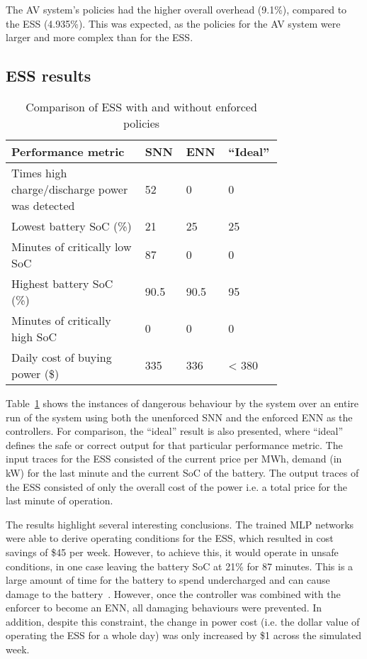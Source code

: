 The \ac{AV} system's policies had the higher overall overhead (9.1\%), compared to the \ac{ESS} (4.935\%).
This was expected, as the policies for the \ac{AV} system were larger and more complex than for the \ac{ESS}.

\subsection{\acf{ESS} results}

\begin{table}[b]
	\vspace{-2mm}
	\centering
        \small{
	\caption{Comparison of ESS with and without enforced policies}
	\label{table:essres}
	\begin{tabular}{|p{0.46\linewidth}|p{0.1\linewidth}|p{0.10\linewidth}|p{0.10\linewidth}|}
		\hline Performance metric & \ac{SNN} &  \ac{ENN} & ``Ideal'' \\ \hline
		Times high charge/discharge power was detected & 52 & 0 & 0 \\ \hline      
		Lowest battery \ac{SoC} (\%) & 21 & 25 & 25 \\ \hline
		Minutes of critically low \ac{SoC} & 87 & 0 & 0 \\ \hline
		Highest battery \ac{SoC} (\%) & 90.5 & 90.5 & 95 \\ \hline
		Minutes of critically high \ac{SoC} & 0 & 0 & 0 \\ \hline
		Daily cost of buying power (\$) & 335 & 336 & < 380 \\ \hline 
	\end{tabular}}
	\vspace{-2mm}
\end{table}

Table~\ref{table:essres} shows the instances of dangerous behaviour by the system over an entire run of the system using both the unenforced \ac{SNN} and the enforced \ac{ENN} as the controllers.
For comparison, the ``ideal'' result is also presented, where ``ideal'' defines the safe or correct output for that particular performance metric.
The input traces for the \ac{ESS} consisted of the current price per MWh, demand (in kW) for the last minute and the current \ac{SoC} of the battery.
The output traces of the \ac{ESS} consisted of only the overall cost of the power i.e. a total price for the last minute of operation.

The results highlight several interesting conclusions.
The trained \ac{MLP} networks were able to derive operating conditions for the \ac{ESS}, which resulted in cost savings of \$45 per week. 
However, to achieve this, it would operate in unsafe conditions, in one case leaving the battery \ac{SoC} at 21\% for 87 minutes.
This is a large amount of time for the battery to spend undercharged and can cause damage to the battery~\cite{guo2016mechanism}.
However, once the controller was combined with the enforcer to become an \ac{ENN}, all damaging behaviours were prevented.
In addition, despite this constraint, the change in power cost (i.e. the dollar value of operating the \ac{ESS} for a whole day) was only increased by \$1 across the simulated week.

